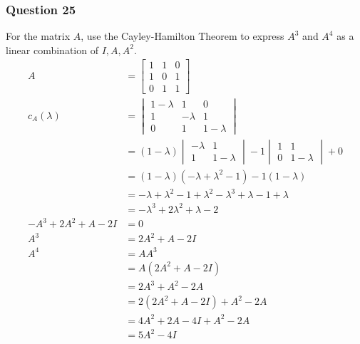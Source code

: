 \documentclass{math}
\begin{document}
\subsubsection*{Question 25}
For the matrix \( A \), use the Cayley-Hamilton Theorem to express \( A^3 \) and
\( A^4 \) as a linear combination of \( I,A,A^2 \).
\begin{align*}
  A &= \begin{bmatrix}
    1 & 1 & 0 \\
    1 & 0 & 1 \\
    0 & 1 & 1
  \end{bmatrix} \\
  c_A(\lambda) &= \begin{vmatrix}
    1-\lambda & 1 & 0 \\
    1 & -\lambda & 1 \\
    0 & 1 & 1-\lambda
  \end{vmatrix} \\
  &= (1-\lambda)\begin{vmatrix}
    -\lambda & 1 \\
    1 & 1-\lambda
  \end{vmatrix}-1\begin{vmatrix}
    1 & 1 \\
    0 & 1-\lambda
  \end{vmatrix}+0 \\
  &= (1-\lambda)(-\lambda+\lambda^2-1)-1(1-\lambda) \\
  &= -\lambda+\lambda^2-1+\lambda^2-\lambda^3+\lambda-1+\lambda \\
  &= -\lambda^3+2\lambda^2+\lambda-2 \\
  -A^3+2A^2+A-2I &= 0 \\
  A^3 &= 2A^2+A-2I \\
  A^4 &= AA^3 \\
  &= A(2A^2+A-2I) \\
  &= 2A^3+A^2-2A \\
  &= 2(2A^2+A-2I)+A^2-2A \\
  &= 4A^2+2A-4I+A^2-2A \\
  &= 5A^2-4I
\end{align*}
\end{document}
